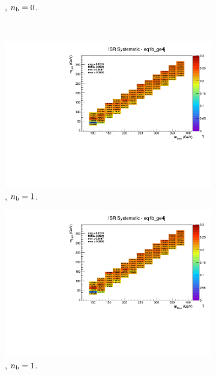 \begin{figure}[ht!]
\begin{subfigure}[b]{0.32\textwidth}
    \caption{\njhigh, $n_{\text{b}} = 0$.}
  \end{subfigure}\\
  \begin{subfigure}[b]{0.32\textwidth}
    \includegraphics[width=\textwidth, page=12]{Figs/sms/t2degen/v19/systs/T2_4body_ISR_eq1b_ge4j.pdf}
    \caption{\njhigh, $n_{\text{b}} = 1$.}
  \end{subfigure}
  \begin{subfigure}[b]{0.32\textwidth}
    \includegraphics[width=\textwidth, page=8]{Figs/sms/t2degen/v19/systs/T2_4body_ISR_eq1b_ge4j.pdf}
    \caption{\njhigh, $n_{\text{b}} = 1$.}
  \end{subfigure}
  \begin{subfigure}[b]{0.32\textwidth}

\end{subfigure}
\end{figure}

